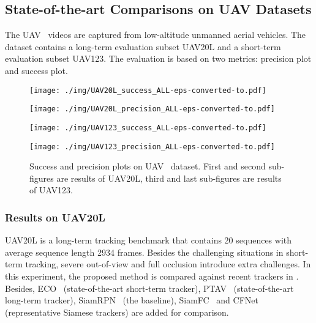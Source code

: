 \documentclass[runningheads]{llncs}
\begin{document}
\subsection{State-of-the-art Comparisons on UAV Datasets}

The UAV~\cite{UAV} videos are captured from low-altitude unmanned aerial vehicles. The dataset contains a long-term evaluation subset UAV20L and a short-term evaluation subset UAV123. The evaluation is based on two metrics: precision plot and success plot.


\begin{figure*}[!tp]
 \centering
\begin{minipage}[c]{3cm}
\texttt{[image: ./img/UAV20L\_success\_ALL-eps-converted-to.pdf]}
\end{minipage}\begin{minipage}[c]{3cm}
\texttt{[image: ./img/UAV20L\_precision\_ALL-eps-converted-to.pdf]}
\end{minipage}\begin{minipage}[c]{3cm}
\texttt{[image: ./img/UAV123\_success\_ALL-eps-converted-to.pdf]}
\end{minipage}\begin{minipage}[c]{3cm}
\texttt{[image: ./img/UAV123\_precision\_ALL-eps-converted-to.pdf]}
\end{minipage}\caption{Success and precision plots on UAV~\cite{UAV} dataset. First and second sub-figures are results of UAV20L, third and last sub-figures are results of UAV123.}
\label{UAV_ALL}

\end{figure*}


\subsubsection{Results on UAV20L}
UAV20L is a long-term tracking benchmark that contains 20 sequences with average sequence length 2934 frames. Besides the challenging situations in short-term tracking, severe out-of-view and full occlusion introduce extra challenges. In this experiment, the proposed method is compared against recent trackers in \cite{UAV}. Besides, ECO~\cite{ECO} (state-of-the-art short-term tracker), PTAV~\cite{PTAV} (state-of-the-art long-term tracker), SiamRPN~\cite{SiamRPN} (the baseline), SiamFC~\cite{SiamFC} and CFNet~\cite{CFNet} (representative Siamese trackers) are added for comparison.
\end{document}
